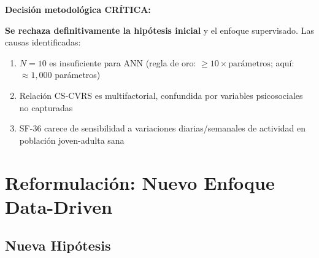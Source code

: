 \documentclass[12pt,letterpaper,twoside]{report}
\begin{document}

\begin{decisionbox}
\textbf{Decisión metodológica CRÍTICA:}

\textbf{Se rechaza definitivamente la hipótesis inicial} y el enfoque supervisado. Las causas identificadas:
\begin{enumerate}[noitemsep]
    \item $N=10$ es insuficiente para ANN (regla de oro: $\geq 10 \times \text{parámetros}$; aquí: $\approx 1,000$ parámetros)
    \item Relación CS-CVRS es multifactorial, confundida por variables psicosociales no capturadas
    \item SF-36 carece de sensibilidad a variaciones diarias/semanales de actividad en población joven-adulta sana
\end{enumerate}
\end{decisionbox}

\section{Reformulación: Nuevo Enfoque Data-Driven}

\subsection{Nueva Hipótesis}
\end{document}
